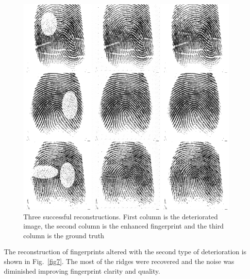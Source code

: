 \documentclass[a4paper,fleqn]{cas-dc}
\begin{document}
\begin{figure}[htbp]
\centerline{\includegraphics[scale=0.28]{figs/recons_1.png}}
\caption{Three successful reconstructions. First column is the deteriorated image, the second column is the enhanced fingerprint and the third column is the ground truth}
\label{fig6}
\end{figure}

The reconstruction of fingerprints altered with the second type of deterioration is shown in Fig.~\ref{fig7}. The most of the ridges were recovered and the noise was diminished improving fingerprint clarity and quality.
\end{document}
